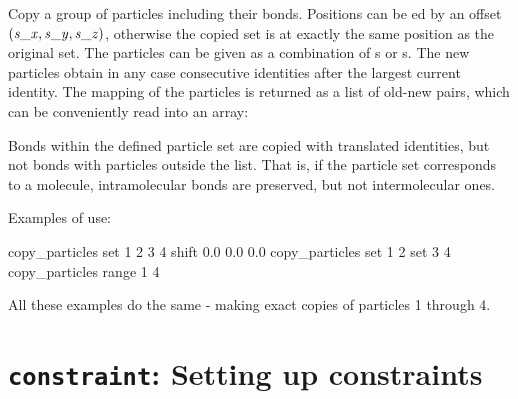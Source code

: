 Copy a group of particles including their bonds. Positions can be
ed by an offset $(\var{s\_x}, \var{s\_y}, \var{s\_z})$,
otherwise the copied set is at exactly the same position as the
original set. The particles can be given as a combination of
s or s. The new particles obtain in any case
consecutive identities after the largest current identity. The mapping
of the particles is returned as a list of old-new pairs, which can be
conveniently read into an array:

Bonds within the defined particle set are copied with translated identities,
but not bonds with particles outside the list. That is, if the
particle set corresponds to a molecule, intramolecular bonds are
preserved, but not intermolecular ones.

Examples of use:\\
\begin{tclcode}
  copy_particles set {1 2 3 4} shift 0.0 0.0 0.0
  copy_particles set {1 2} set {3 4}
  copy_particles range 1 4
\end{tclcode}
All these examples do the same - making exact copies of particles 1 through 4.

\section{\texttt{constraint}: Setting up constraints}\label{sec:constraint}

